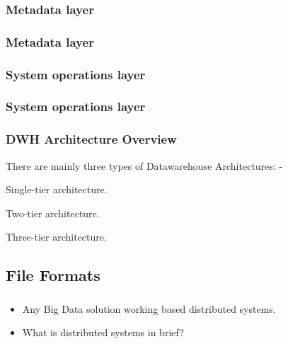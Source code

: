 \subsubsection{Metadata layer}

\begin{frame}
\frametitle{Metadata layer}
\end{frame}

\subsubsection{System operations layer}

\begin{frame}
\frametitle{System operations layer}
\end{frame}



\begin{frame}
\frametitle{DWH Architecture Overview}
There are mainly three types of Datawarehouse Architectures: -
\begin{wideitemize}
	\item Single-tier architecture.
	\item Two-tier architecture.
	\item Three-tier architecture.
\end{wideitemize}

\end{frame}


\subsection{File Formats}

\begin{frame}
\frametitle{\subsecname}
\begin{itemize}[<+->]
	\item Any Big Data solution working based distributed systems.
	\item What is distributed systems in brief?
\end{itemize}
\end{frame}
